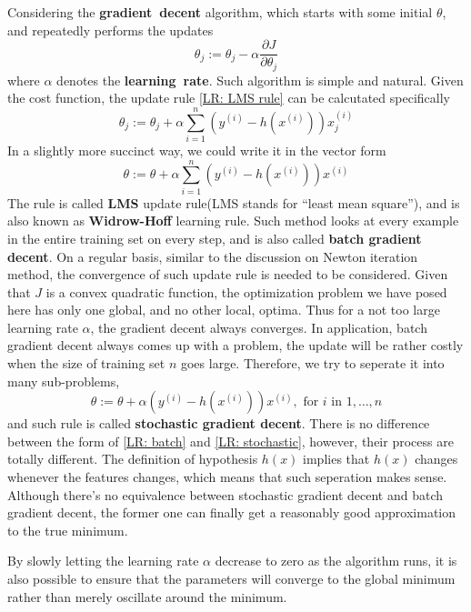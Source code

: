 Considering the \textbf{gradient~decent} algorithm, which starts with some initial $\theta$, and repeatedly performs the updates 
\begin{equation}
    \label{LR: LMS rule}
    \theta_j := \theta_j - \alpha\frac{\partial J}{\partial \theta_j}
\end{equation}
where $\alpha$ denotes the \textbf{learning~rate}. Such algorithm is simple and natural. Given the cost function, the update rule \ref{LR: LMS rule} can be calcutated specifically
\[\theta_j:=\theta_j+\alpha\sum_{i=1}^{n}(y^{(i)}-h(x^{(i)}))x^{(i)}_j \]
In a slightly more succinct way, we could write it in the vector form
\begin{equation}
    \label{LR: batch}
    \theta := \theta + \alpha\sum_{i=1}^{n}(y^{(i)}-h(x^{(i)}))x^{(i)}
\end{equation}
The rule is called \textbf{LMS} update rule(LMS stands for ``least mean square''), and is also known as \textbf{Widrow-Hoff} learning rule. Such method looks at every example in the entire training
set on every step, and is also called \textbf{batch gradient decent}. On a regular basis, similar to the discussion on Newton iteration method, the convergence of such update rule is needed to be 
considered. Given that $J$ is a convex quadratic function, the optimization problem we have posed here has only one global, and no other local, optima. Thus for a not too large learning rate $\alpha$,
the gradient decent always converges.  
In application, batch gradient decent always comes up with a problem, the update will be rather costly when the size of training set $n$ goes large. Therefore, we try to seperate it into many sub-problems,
\begin{equation}
    \label{LR: stochastic}
    \theta := \theta + \alpha(y^{(i)}-h(x^{(i)}))x^{(i)}, \text{ for $i$ in }1,\ldots,n
\end{equation}
and such rule is called \textbf{stochastic gradient decent}. There is no difference between the form of \ref{LR: batch} and \ref{LR: stochastic}, however, their process are totally different. The definition
of hypothesis $h(x)$ implies that $h(x)$ changes whenever the features changes, which means that such seperation makes sense. Although there's no equivalence between stochastic gradient decent and
batch gradient decent, the former one can finally get a reasonably good approximation to the true minimum.

\small By slowly letting the learning rate $\alpha$ decrease to zero as the algorithm runs, it is also possible to ensure that the parameters will converge to the global minimum rather than merely
oscillate around the minimum.

